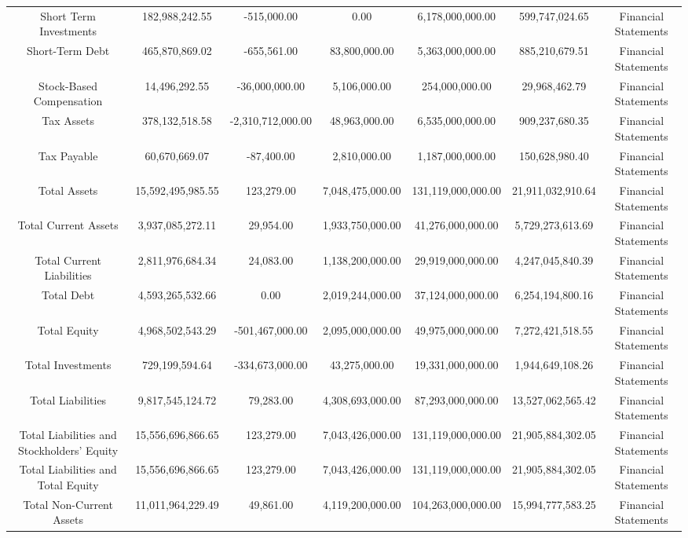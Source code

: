\begin{longtable}{ccccccc}
Short Term Investments & 182,988,242.55 & -515,000.00 & 0.00 & 6,178,000,000.00 & 599,747,024.65 & Financial Statements \\
Short-Term Debt & 465,870,869.02 & -655,561.00 & 83,800,000.00 & 5,363,000,000.00 & 885,210,679.51 & Financial Statements \\
Stock-Based Compensation & 14,496,292.55 & -36,000,000.00 & 5,106,000.00 & 254,000,000.00 & 29,968,462.79 & Financial Statements \\
Tax Assets & 378,132,518.58 & -2,310,712,000.00 & 48,963,000.00 & 6,535,000,000.00 & 909,237,680.35 & Financial Statements \\
Tax Payable & 60,670,669.07 & -87,400.00 & 2,810,000.00 & 1,187,000,000.00 & 150,628,980.40 & Financial Statements \\
Total Assets & 15,592,495,985.55 & 123,279.00 & 7,048,475,000.00 & 131,119,000,000.00 & 21,911,032,910.64 & Financial Statements \\
Total Current Assets & 3,937,085,272.11 & 29,954.00 & 1,933,750,000.00 & 41,276,000,000.00 & 5,729,273,613.69 & Financial Statements \\
Total Current Liabilities & 2,811,976,684.34 & 24,083.00 & 1,138,200,000.00 & 29,919,000,000.00 & 4,247,045,840.39 & Financial Statements \\
Total Debt & 4,593,265,532.66 & 0.00 & 2,019,244,000.00 & 37,124,000,000.00 & 6,254,194,800.16 & Financial Statements \\
Total Equity & 4,968,502,543.29 & -501,467,000.00 & 2,095,000,000.00 & 49,975,000,000.00 & 7,272,421,518.55 & Financial Statements \\
Total Investments & 729,199,594.64 & -334,673,000.00 & 43,275,000.00 & 19,331,000,000.00 & 1,944,649,108.26 & Financial Statements \\
Total Liabilities & 9,817,545,124.72 & 79,283.00 & 4,308,693,000.00 & 87,293,000,000.00 & 13,527,062,565.42 & Financial Statements \\
Total Liabilities and Stockholders' Equity & 15,556,696,866.65 & 123,279.00 & 7,043,426,000.00 & 131,119,000,000.00 & 21,905,884,302.05 & Financial Statements \\
Total Liabilities and Total Equity & 15,556,696,866.65 & 123,279.00 & 7,043,426,000.00 & 131,119,000,000.00 & 21,905,884,302.05 & Financial Statements \\
Total Non-Current Assets & 11,011,964,229.49 & 49,861.00 & 4,119,200,000.00 & 104,263,000,000.00 & 15,994,777,583.25 & Financial Statements \\

\end{longtable}
